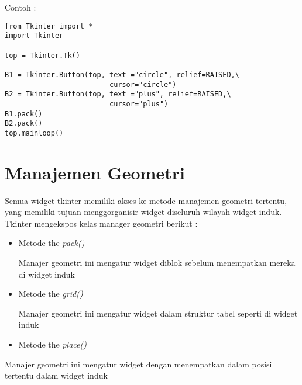 \vspace{12pt}
Contoh : \par
\begin{verbatim}
from Tkinter import *
import Tkinter

top = Tkinter.Tk()

B1 = Tkinter.Button(top, text ="circle", relief=RAISED,\
                         cursor="circle")
B2 = Tkinter.Button(top, text ="plus", relief=RAISED,\
                         cursor="plus")
B1.pack()
B2.pack()
top.mainloop()

\end{verbatim}
\section{Manajemen Geometri}
\noindent 
 \hspace*{0.5in} Semua widget tkinter memiliki akses ke metode manajemen geometri tertentu, yang memiliki tujuan menggorganisir widget diseluruh wilayah widget induk. Tkinter mengekspos kelas manager geometri berikut : \par
\noindent 
\begin{itemize}
	\item Metode the \textit{pack()} \par
	\noindent 
	Manajer geometri ini mengatur widget diblok sebelum menempatkan mereka di widget induk \par
	\noindent 
	\item Metode the \textit{grid()} \par
	\noindent 
	Manajer geometri ini mengatur widget dalam struktur tabel seperti di widget induk \par
	\noindent 
	\item Metode the  \textit{place()}\end{itemize} \par
	\noindent 
	Manajer geometri ini mengatur widget dengan menempatkan dalam posisi tertentu dalam widget induk \par
	\vspace{12pt}
	\noindent 
